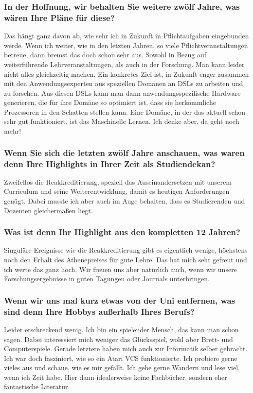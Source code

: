{\subsubsection{In der Hoffnung, wir behalten Sie weitere zwölf Jahre, was wären Ihre Pläne für diese?}
Das hängt ganz davon ab, wie sehr ich in Zukunft in Pflichtaufgaben eingebunden werde. Wenn ich weiter, wie in den letzten Jahren, so viele Pflichtveranstaltungen betreue, dann bremst das doch schon sehr aus. Sowohl in Bezug auf weiterführende Lehrveranstaltungen, als auch in der Forschung. Man kann leider nicht alles gleichzeitig machen. Ein konkretes Ziel ist, in Zukunft enger zusammen mit den Anwendungsexperten aus speziellen Domänen an DSLs zu arbeiten und zu forschen. Aus diesen DSLs kann man dann anwendungsspezifische Hardware generieren, die für ihre Domäne so optimiert ist, dass sie herkömmliche Prozessoren in den Schatten stellen kann. Eine Domäne, in der das aktuell schon sehr gut funktioniert, ist das Maschinelle Lernen. Ich denke aber, da geht noch mehr!

\subsubsection{Wenn Sie sich die letzten zwölf Jahre anschauen, was waren denn Ihre Highlights in Ihrer Zeit als Studiendekan?}
Zweifellos die Reakkreditierung, speziell das Auseinandersetzen mit unserem Curriculum und seine Weiterentwicklung, damit es heutigen Anforderungen genügt. Dabei musste ich aber auch im Auge behalten, dass es Studierenden und Dozenten gleichermaßen liegt.

\subsubsection{Was ist denn Ihr Highlight aus den kompletten 12 Jahren?}
Singuläre Ereignisse wie die Reakkreditierung gibt es eigentlich wenige, höchstens noch den Erhalt des Athenepreises für gute Lehre. Das hat mich sehr gefreut und ich werte das ganz hoch. Wir freuen uns aber natürlich auch, wenn wir unsere Forschungsergebnisse in guten Tagungen oder Journals unterbringen.

\subsubsection{Wenn wir uns mal kurz etwas von der Uni entfernen, was sind denn Ihre Hobbys außerhalb Ihres Berufs?}
Leider erschreckend wenig. Ich bin ein spielender Mensch, das kann man schon sagen. Dabei interessiert mich weniger das Glücksspiel, wohl aber Brett- und Computerspiele. Gerade letztere haben mich auch zur Informatik selber gebracht. Ich war doch fasziniert, wie so ein Atari VCS funktionierte. Ich probiere gerne vieles aus und schaue, wie es mir gefällt. Ich gehe gerne Wandern und lese viel, wenn ich Zeit habe. Hier dann idealerweise keine Fachbücher, sondern eher fantastische Literatur.

}

